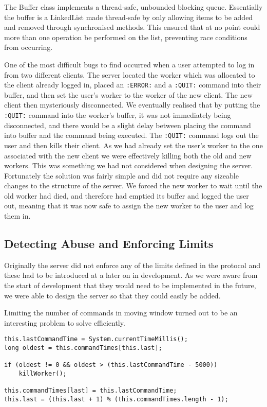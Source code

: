 The Buffer class implements a thread-safe, unbounded blocking queue. Essentially the buffer is a LinkedList made thread-safe by only allowing items to be added and removed through synchronised methods. This ensured that at no point could more than one operation be performed on the list, preventing race conditions from occurring.

One of the most difficult bugs to find occurred when a user attempted to log in from two different clients. The server located the worker which was allocated to the client already logged in, placed an \texttt{:ERROR:} and a \texttt{:QUIT:} command into their buffer, and then set the user's worker to the worker of the new client. The new client then mysteriously disconnected. We eventually realised that by putting the \texttt{:QUIT:} command into the worker's buffer, it was not immediately being disconnected, and there would be a slight delay between placing the command into buffer and the command being executed. The \texttt{:QUIT:} command logs out the user and then kills their client. As we had already set the user's worker to the one associated with the new client we were effectively killing both the old and new workers. This was something we had not considered when designing the server. Fortunately the solution was fairly simple and did not require any sizeable changes to the structure of the server. We forced the new worker to wait until the old worker had died, and therefore had emptied its buffer and logged the user out, meaning that it was now safe to assign the new worker to the user and log them in.

\subsection{Detecting Abuse and Enforcing Limits}
Originally the server did not enforce any of the limits defined in the protocol and these had to be introduced at a later on in development. As we were aware from the start of development that they would need to be implemented in the future, we were able to design the server so that they could easily be added. 

Limiting the number of commands in moving window turned out to be an interesting problem to solve efficiently.

\begin{verbatim}
this.lastCommandTime = System.currentTimeMillis();
long oldest = this.commandTimes[this.last];

if (oldest != 0 && oldest > (this.lastCommandTime - 5000))
    killWorker();

this.commandTimes[last] = this.lastCommandTime;
this.last = (this.last + 1) % (this.commandTimes.length - 1);
\end{verbatim}


		
